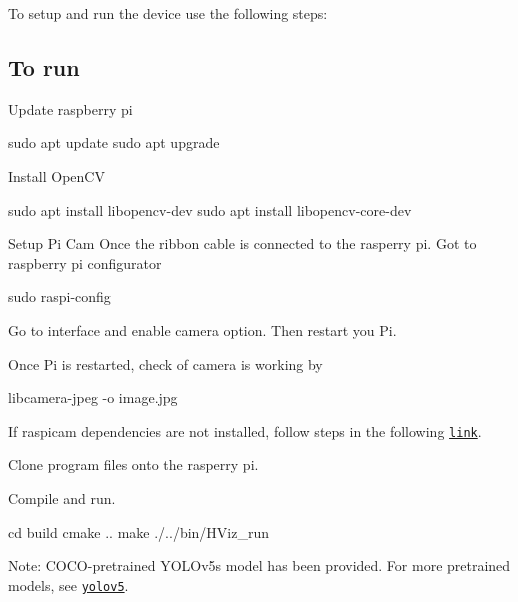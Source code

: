 To setup and run the device use the following steps\+:

\subsection*{To run}


\begin{DoxyEnumerate}
\item Update raspberry pi 
\begin{DoxyCode}
sudo apt update
sudo apt upgrade
\end{DoxyCode}

\item Install Open\+CV 
\begin{DoxyCode}
sudo apt install libopencv-dev
sudo apt install libopencv-core-dev
\end{DoxyCode}

\item Setup Pi Cam Once the ribbon cable is connected to the rasperry pi. Got to raspberry pi configurator 
\begin{DoxyCode}
sudo raspi-config
\end{DoxyCode}

\item Go to interface and enable camera option. Then restart you Pi.
\item Once Pi is restarted, check of camera is working by 
\begin{DoxyCode}
libcamera-jpeg -o image.jpg
\end{DoxyCode}

\item If raspicam dependencies are not installed, follow steps in the following \href{https://github.com/cedricve/raspicam}{\tt link}.
\item Clone program files onto the rasperry pi.
\item Compile and run. 
\begin{DoxyCode}
cd build
cmake ..
make
./../bin/HViz\_run
\end{DoxyCode}

\end{DoxyEnumerate}

Note\+: C\+O\+C\+O-\/pretrained Y\+O\+L\+Ov5s model has been provided. For more pretrained models, see \href{https://github.com/ultralytics/yolov5}{\tt yolov5}. 